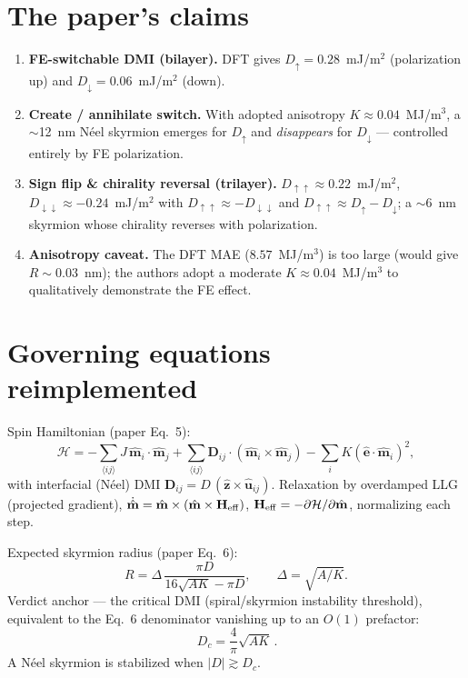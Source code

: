 \documentclass[11pt]{article}
\begin{document}
\section{The paper's claims}
\begin{enumerate}
\item \textbf{FE-switchable DMI (bilayer).} DFT gives $D_\uparrow=0.28$~mJ/m$^2$
(polarization up) and $D_\downarrow=0.06$~mJ/m$^2$ (down).
\item \textbf{Create / annihilate switch.} With adopted anisotropy
$K\approx0.04$~MJ/m$^3$, a $\sim$12~nm N\'eel skyrmion emerges for $D_\uparrow$
and \emph{disappears} for $D_\downarrow$ --- controlled entirely by FE
polarization.
\item \textbf{Sign flip \& chirality reversal (trilayer).}
$D_{\uparrow\uparrow}\approx0.22$~mJ/m$^2$,
$D_{\downarrow\downarrow}\approx-0.24$~mJ/m$^2$ with
$D_{\uparrow\uparrow}\approx-D_{\downarrow\downarrow}$ and
$D_{\uparrow\uparrow}\approx D_\uparrow-D_\downarrow$; a $\sim$6~nm skyrmion whose
chirality reverses with polarization.
\item \textbf{Anisotropy caveat.} The DFT MAE ($8.57$~MJ/m$^3$) is too large
(would give $R\sim0.03$~nm); the authors adopt a moderate
$K\approx0.04$~MJ/m$^3$ to qualitatively demonstrate the FE effect.
\end{enumerate}

\section{Governing equations reimplemented}
Spin Hamiltonian (paper Eq.~5):
\begin{equation}
\mathcal{H}=-\!\sum_{\langle ij\rangle}\!J\,\hat{\mathbf m}_i\!\cdot\!\hat{\mathbf m}_j
+\!\sum_{\langle ij\rangle}\!\mathbf D_{ij}\!\cdot\!(\hat{\mathbf m}_i\!\times\!\hat{\mathbf m}_j)
-\sum_i K(\hat{\mathbf e}\!\cdot\!\hat{\mathbf m}_i)^2 ,
\end{equation}
with interfacial (N\'eel) DMI $\mathbf D_{ij}=D\,(\hat{\mathbf z}\times\hat{\mathbf u}_{ij})$.
Relaxation by overdamped LLG (projected gradient),
$\dot{\hat{\mathbf m}}=\hat{\mathbf m}\times(\hat{\mathbf m}\times\mathbf H_{\rm eff})$,
$\mathbf H_{\rm eff}=-\partial\mathcal H/\partial\hat{\mathbf m}$, normalizing each step.

Expected skyrmion radius (paper Eq.~6):
\begin{equation}
R=\Delta\,\frac{\pi D}{16\sqrt{AK}-\pi D},\qquad \Delta=\sqrt{A/K}.
\end{equation}
Verdict anchor --- the critical DMI (spiral/skyrmion instability threshold),
equivalent to the Eq.~6 denominator vanishing up to an $O(1)$ prefactor:
\begin{equation}
\boxed{\,D_c=\frac{4}{\pi}\sqrt{AK}\,}.
\end{equation}
A N\'eel skyrmion is stabilized when $|D|\gtrsim D_c$.
\end{document}
